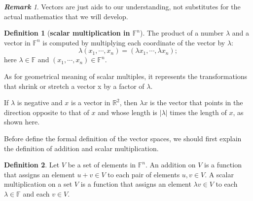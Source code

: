 \documentclass[paper=a4, fontsize=11pt]{scrartcl}
\numberwithin{equation}{section}		%
\numberwithin{figure}{section}			%
\numberwithin{table}{section}				%
\theoremstyle{definition}
\newtheorem{definition}{Definition}[section]
\theoremstyle{remark}
\newtheorem*{remark}{\textbf{Remark}}
\theoremstyle{example}
\begin{document}
\begin{remark}
    Vectors are just aids to our understanding, not substitutes for the actual mathematics that we will develop.
\end{remark}

\begin{definition}[\textbf{scalar multiplication in $\mathbb{F}^n$}]
    The product of a number $\lambda$ and a vector in $\mathbb{F}^n$ is computed by multiplying each coordinate of the vector by $\lambda$:
    \begin{equation}
        \lambda(x_1, \cdots, x_n) = (\lambda x_1, \cdots, \lambda x_n);
    \end{equation}
    here $\lambda \in \mathbb{F}$ and $(x_1,\cdots,x_n) \in \mathbb{F}^n$.
\end{definition}

As for geometrical meaning of scalar multiples, it represents the transformations that shrink or stretch a vector x by a factor of $\lambda$.

If $\lambda$ is negative and $x$ is a vector in $\mathbb{R}^2$, then $\lambda x$ is the vector that points in the direction opposite to that of $x$ and whose length is $\lvert \lambda \rvert$ times the length of $x$, as shown here.

Before define the formal definition of the vector spaces, we should first explain the definition of addition and scalar multiplication.

\begin{definition}
    Let $V$ be a set of elements in $\mathbb{F}^n$. An addition on $V$ is a function that assigns an element $u+v\in V$ to each pair of elements $u,v \in V$. A scalar multiplication on a set $V$ is a function that assigns an element $\lambda v \in V$ to each $\lambda \in \mathbb{F}$ and each $v \in V$.
\end{definition}
\end{document}
